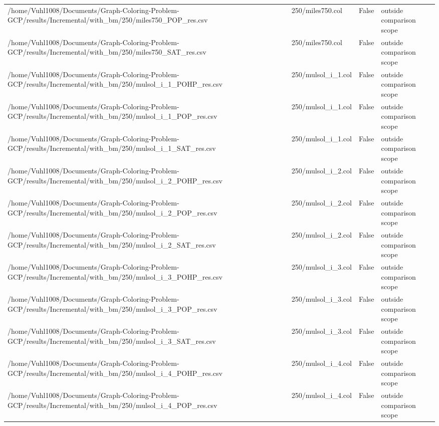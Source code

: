 \begin{table}[htbp]
\begin{tabular}{llll}
/home/Vuhl1008/Documents/Graph-Coloring-Problem-GCP/results/Incremental/with\_bm/250/miles750\_POP\_res.csv & 250/miles750.col & False & outside comparison scope \\
/home/Vuhl1008/Documents/Graph-Coloring-Problem-GCP/results/Incremental/with\_bm/250/miles750\_SAT\_res.csv & 250/miles750.col & False & outside comparison scope \\
/home/Vuhl1008/Documents/Graph-Coloring-Problem-GCP/results/Incremental/with\_bm/250/mulsol\_i\_1\_POHP\_res.csv & 250/mulsol\_i\_1.col & False & outside comparison scope \\
/home/Vuhl1008/Documents/Graph-Coloring-Problem-GCP/results/Incremental/with\_bm/250/mulsol\_i\_1\_POP\_res.csv & 250/mulsol\_i\_1.col & False & outside comparison scope \\
/home/Vuhl1008/Documents/Graph-Coloring-Problem-GCP/results/Incremental/with\_bm/250/mulsol\_i\_1\_SAT\_res.csv & 250/mulsol\_i\_1.col & False & outside comparison scope \\
/home/Vuhl1008/Documents/Graph-Coloring-Problem-GCP/results/Incremental/with\_bm/250/mulsol\_i\_2\_POHP\_res.csv & 250/mulsol\_i\_2.col & False & outside comparison scope \\
/home/Vuhl1008/Documents/Graph-Coloring-Problem-GCP/results/Incremental/with\_bm/250/mulsol\_i\_2\_POP\_res.csv & 250/mulsol\_i\_2.col & False & outside comparison scope \\
/home/Vuhl1008/Documents/Graph-Coloring-Problem-GCP/results/Incremental/with\_bm/250/mulsol\_i\_2\_SAT\_res.csv & 250/mulsol\_i\_2.col & False & outside comparison scope \\
/home/Vuhl1008/Documents/Graph-Coloring-Problem-GCP/results/Incremental/with\_bm/250/mulsol\_i\_3\_POHP\_res.csv & 250/mulsol\_i\_3.col & False & outside comparison scope \\
/home/Vuhl1008/Documents/Graph-Coloring-Problem-GCP/results/Incremental/with\_bm/250/mulsol\_i\_3\_POP\_res.csv & 250/mulsol\_i\_3.col & False & outside comparison scope \\
/home/Vuhl1008/Documents/Graph-Coloring-Problem-GCP/results/Incremental/with\_bm/250/mulsol\_i\_3\_SAT\_res.csv & 250/mulsol\_i\_3.col & False & outside comparison scope \\
/home/Vuhl1008/Documents/Graph-Coloring-Problem-GCP/results/Incremental/with\_bm/250/mulsol\_i\_4\_POHP\_res.csv & 250/mulsol\_i\_4.col & False & outside comparison scope \\
/home/Vuhl1008/Documents/Graph-Coloring-Problem-GCP/results/Incremental/with\_bm/250/mulsol\_i\_4\_POP\_res.csv & 250/mulsol\_i\_4.col & False & outside comparison scope \\

\end{tabular}
\end{table}
